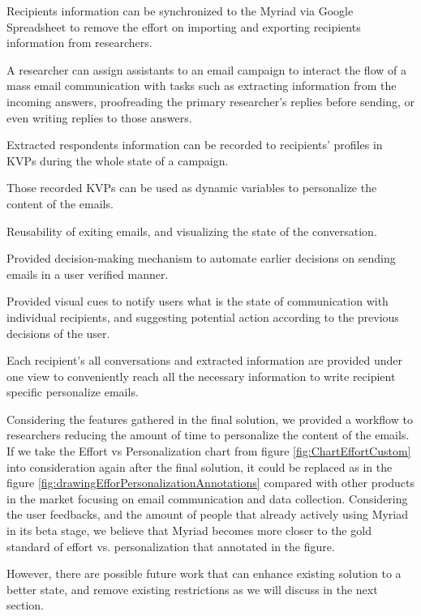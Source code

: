 \begin{compactitem}
	\item Recipients information can be synchronized to the Myriad via Google Spreadsheet to remove the effort on importing and exporting recipients information from researchers.
	\item A researcher can assign assistants to an email campaign to interact the flow of a mass email communication with tasks such as extracting information from the incoming answers, proofreading the primary researcher's replies before sending, or even writing replies to those answers.
	\item Extracted respondents information can be recorded to recipients' profiles in \ac{KVP}s during the whole state of a campaign. 
	\item Those recorded \ac{KVP}s can be used as dynamic variables to personalize the content of the emails.
	\item Reusability of exiting emails, and visualizing the state of the conversation.
	\item Provided decision-making mechanism to automate earlier decisions on sending emails in a user verified manner.
	\item Provided visual cues to notify users what is the state of communication with individual recipients, and suggesting potential action according to the previous decisions of the user.
	\item Each recipient's all conversations and extracted information are provided under one view to conveniently reach all the necessary information to write recipient specific personalize emails.
 \end{compactitem}

Considering the features gathered in the final solution, we provided a workflow to researchers reducing the amount of time to personalize the content of the emails. If we take the Effort vs Personalization chart from figure \ref{fig:ChartEffortCustom} into consideration again after the final solution, it could be replaced as in the figure \ref{fig:drawingEfforPersonalizationAnnotations} compared with other products in the market focusing on email communication and data collection. Considering the user feedbacks, and the amount of people that already actively using Myriad in its beta stage, we believe that Myriad becomes more closer to the gold standard of effort vs. personalization that annotated in the figure.
\vspace{1cm}

However, there are possible future work that can enhance existing solution to a better state, and remove existing restrictions as we will discuss in the next section.
\clearpage 

